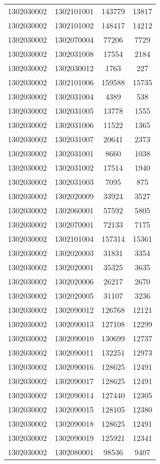 \begin{longtable}[h]{llcc}
		1302030002 & 1302101001 & 143779 & 13817\\
		1302030002 & 1302101002 & 148417 & 14212\\
		1302030002 & 1302070004 & 77206 & 7729\\
		1302030002 & 1302031008 & 17554 & 2184\\
		1302030002 & 1302030012 & 1763 & 227\\
		1302030002 & 1302101006 & 159588 & 15735\\
		1302030002 & 1302031004 & 4389 & 538\\
		1302030002 & 1302031005 & 13778 & 1555\\
		1302030002 & 1302031006 & 11522 & 1365\\
		1302030002 & 1302031007 & 20641 & 2373\\
		1302030002 & 1302031001 & 8660 & 1038\\
		1302030002 & 1302031002 & 17514 & 1940\\
		1302030002 & 1302031003 & 7095 & 875\\
		1302030002 & 1302020009 & 33924 & 3527\\
		1302030002 & 1302060001 & 57592 & 5805\\
		1302030002 & 1302070001 & 72133 & 7175\\
		1302030002 & 1302101004 & 157314 & 15361\\
		1302030002 & 1302020003 & 31831 & 3354\\
		1302030002 & 1302020001 & 35325 & 3635\\
		1302030002 & 1302020006 & 26217 & 2670\\
		1302030002 & 1302020005 & 31107 & 3236\\
		1302030002 & 1302090012 & 126768 & 12121\\
		1302030002 & 1302090013 & 127108 & 12299\\
		1302030002 & 1302090010 & 130699 & 12737\\
		1302030002 & 1302090011 & 132251 & 12973\\
		1302030002 & 1302090016 & 128625 & 12491\\
		1302030002 & 1302090017 & 128625 & 12491\\
		1302030002 & 1302090014 & 127440 & 12305\\
		1302030002 & 1302090015 & 128105 & 12380\\
		1302030002 & 1302090018 & 128625 & 12491\\
		1302030002 & 1302090019 & 125921 & 12341\\
		1302030002 & 1302080001 & 98536 & 9407\\

\end{longtable}
